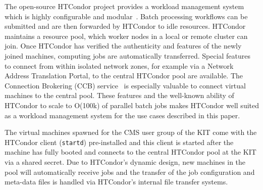 The open-source HTCondor project provides a workload management system which is highly configurable and modular~\cite{HTCondor}. Batch processing workflows can be submitted and are then forwarded by HTCondor to idle resources. HTCondor maintains a resource pool, which worker nodes in a local or remote cluster can join. Once HTCondor has verified the authenticity and features of the newly joined machines, computing jobs are automatically transferred. Special features to connect from within isolated network zones, for example via a Network Address Translation Portal, to the central HTCondor pool are available. The Connection Brokering (CCB) service~\cite{HTCondorCCB} is especially valuable to connect virtual machines to the central pool. These features and the well-known ability of HTCondor to scale to O(100k) of parallel batch jobs makes HTCondor well suited as a workload management system for the use cases described in this paper.

The virtual machines spawned for the CMS user group of the KIT come with the HTCondor client (\texttt{startd}) pre-installed and this client is started after the machine has fully booted and connects to the central HTCondor pool at the KIT via a shared secret. Due to HTCondor's dynamic design, new machines in the pool will automatically receive jobs and the transfer of the job configuration and meta-data files is handled via HTCondor's internal file transfer systems.